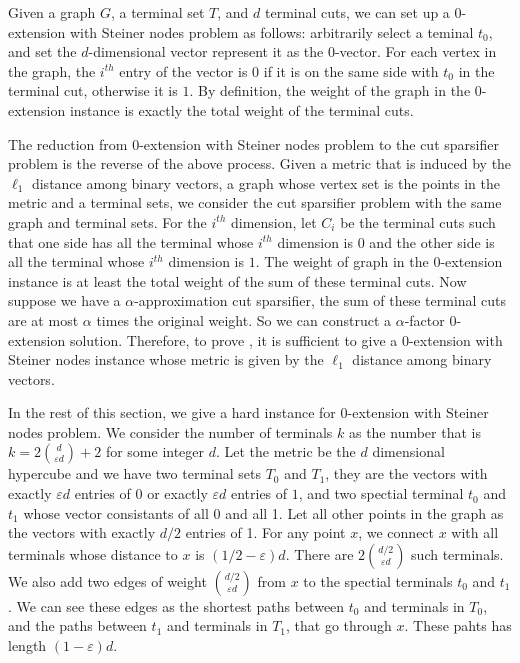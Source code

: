 \documentclass[11pt]{article}
\theoremstyle{definition}
\newcommand{\eps}{{\varepsilon}}
\begin{document}
Given a graph $G$, a terminal set $T$, and $d$ terminal cuts, we can set up a 0-extension with Steiner nodes problem as follows: arbitrarily select a teminal $t_0$, and set the $d$-dimensional vector represent it as the $0$-vector. For each vertex in the graph, the $i^{th}$ entry of the vector is $0$ if it is on the same side with $t_0$ in the terminal cut, otherwise it is $1$. By definition, the weight of the graph in the 0-extension instance is exactly the total weight of the terminal cuts.

The reduction from 0-extension with Steiner nodes problem to the cut sparsifier problem is the reverse of the above process. Given a metric that is induced by the $\ell_1$ distance among binary vectors, a graph whose vertex set is the points in the metric and a terminal sets, we consider the cut sparsifier problem with the same graph and terminal sets. For the $i^{th}$ dimension, let $C_i$ be the terminal cuts such that one side has all the terminal whose $i^{th}$ dimension is $0$ and the other side is all the terminal whose $i^{th}$ dimension is $1$. The weight of graph in the 0-extension instance is at least the total weight of the sum of these terminal cuts. Now suppose we have a $\alpha$-approximation cut sparsifier, the sum of these terminal cuts are at most $\alpha$ times the original weight. So we can construct a $\alpha$-factor 0-extension solution. Therefore, to prove , it is sufficient to give a 0-extension with Steiner nodes instance whose metric is given by the $\ell_1$ distance among binary vectors.

In the rest of this section, we give a hard instance for 0-extension with Steiner nodes problem. We consider the number of terminals $k$ as the number that is $k=2\binom{d}{\eps d}+2$ for some integer $d$. Let the metric be the $d$ dimensional hypercube and we have two terminal sets $T_0$ and $T_1$, they are the vectors with exactly $\eps d$ entries of 0 or exactly $\eps d$ entries of $1$, and two spectial terminal $t_0$ and $t_1$ whose vector consistants of all 0 and all 1. Let all other points in the graph as the vectors with exactly $d/2$ entries of 1. For any point $x$, we connect $x$ with all terminals whose distance to $x$ is $(1/2-\eps)d$. There are $2\binom{d/2}{\eps d}$ such terminals. We also add two edges of weight $\binom{d/2}{\eps d}$ from $x$ to the spectial terminals $t_0$ and $t_1$. We can see these edges as the shortest paths between $t_0$ and terminals in $T_0$, and the paths between $t_1$ and terminals in $T_1$, that go through $x$. These pahts has length $(1-\eps)d$.
\end{document}

